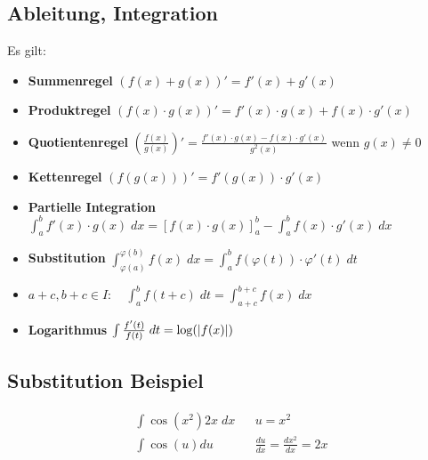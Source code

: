 \subsection*{Ableitung, Integration}
Es gilt:
\begin{itemize}
  \item \textbf{Summenregel} $ (f (x) + g (x))' = f' (x) + g' (x)$
  \item \textbf{Produktregel} $ (f (x) \cdot g (x))' = f' (x) \cdot g (x) + f (x) \cdot g' (x)$
  \item \textbf{Quotientenregel} $\left( \frac{f (x)}{g (x)} \right)' = \frac{f' (x) \cdot g (x) - f (x) \cdot g' (x)}{g^2 (x)}$ wenn $g (x) \neq 0$
  \item \textbf{Kettenregel} $ (f (g (x)))' = f' (g (x)) \cdot g' (x)$
  \item \textbf{Partielle Integration} $\int_a^b f' (x) \cdot g (x) \; dx = [f (x) \cdot g (x)]_a^b - \int_a^b f (x) \cdot g' (x) \; dx$
  \item \textbf{Substitution} $\int_{\varphi (a)}^{\varphi (b)} f (x) \; dx = \int_a^b f (\varphi (t)) \cdot \varphi' (t) \; dt$
  \item $a+c, b+c \in I: \quad \int_a^b f (t + c) \; dt = \int_{a+c}^{b+c} f (x) \; dx$
  \item \textbf{Logarithmus} $\int \frac{f' (t)}{f (t)} \; dt = \log (\abs{f (x)})$
\end{itemize}
\subsection*{Substitution Beispiel}
\begin{align*}
  \int \cos (x^2) 2x \; dx &  & u = x^2                              \\
  \int \cos (u) du         &  & \frac{du}{dx} = \frac{dx^2}{dx} = 2x
\end{align*}